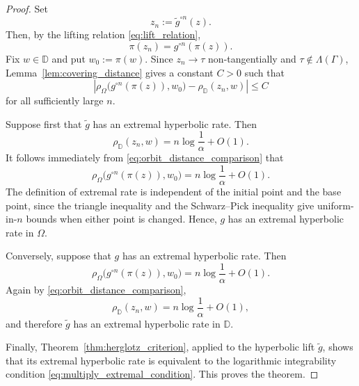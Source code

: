 \documentclass[10pt,a4paper]{amsart}
\numberwithin{equation}{section}
\begin{document}
\begin{proof}
Set
\begin{equation*}
z_n:=\widetilde g^{\circ n}(z).
\end{equation*}
Then, by the lifting relation \eqref{eq:lift_relation},
\begin{equation*}
\pi(z_n)=g^{\circ n}(\pi(z)).
\end{equation*}
Fix $w\in\mathbb D$ and put $w_0:=\pi(w)$. Since
$z_n\to\tau$ non-tangentially and $\tau\notin\Lambda(\Gamma)$,
Lemma~\ref{lem:covering_distance} gives a constant $C>0$ such that
\begin{equation}
\label{eq:orbit_distance_comparison}
\left|
\rho_\Omega\bigl(g^{\circ n}(\pi(z)),w_0\bigr)
-
\rho_{\mathbb D}(z_n,w)
\right|
\le C
\end{equation}
for all sufficiently large $n$.

Suppose first that $\widetilde g$ has an extremal hyperbolic rate. Then
\begin{equation*}
\rho_{\mathbb D}(z_n,w)
=
n\log\frac1\alpha+O(1).
\end{equation*}
It follows immediately from \eqref{eq:orbit_distance_comparison} that
\begin{equation*}
\rho_\Omega\bigl(g^{\circ n}(\pi(z)),w_0\bigr)
=
n\log\frac1\alpha+O(1).
\end{equation*}
The definition of extremal rate is independent of the initial point and
the base point, since the triangle inequality and the Schwarz--Pick
inequality give uniform-in-$n$ bounds when either point is changed.
Hence, $g$ has an extremal hyperbolic rate in $\Omega$.

Conversely, suppose that $g$ has an extremal hyperbolic rate. Then
\begin{equation*}
\rho_\Omega\bigl(g^{\circ n}(\pi(z)),w_0\bigr)
=
n\log\frac1\alpha+O(1).
\end{equation*}
Again by \eqref{eq:orbit_distance_comparison},
\begin{equation*}
\rho_{\mathbb D}(z_n,w)
=
n\log\frac1\alpha+O(1),
\end{equation*}
and therefore $\widetilde g$ has an extremal hyperbolic rate in
$\mathbb D$.

Finally, Theorem~\ref{thm:herglotz_criterion}, applied to the hyperbolic
lift $\widetilde g$, shows that its extremal hyperbolic rate is equivalent
to the logarithmic integrability condition
\eqref{eq:multiply_extremal_condition}. This proves the theorem.
\end{proof}
\end{document}
